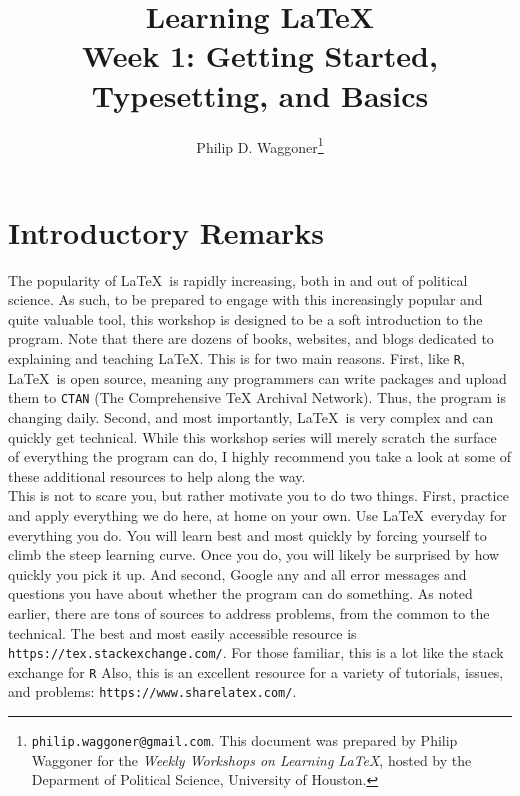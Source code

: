 \documentclass[11pt]{article}
\newcommand{\forceindent}{\leavevmode{\parindent=1.5em\indent}} %
\begin{document}
	
	\title{Learning \LaTeX \\
		\vspace{1cm}
	\large Week 1: Getting Started, Typesetting, and Basics \\
		\vspace{1cm}}
	\author{Philip D. Waggoner\footnote{{\texttt{philip.waggoner@gmail.com}}. This document was prepared by Philip Waggoner for the \textit{Weekly Workshops on Learning \LaTeX}, hosted by the Deparment of Political Science, University of Houston.}}
	\date{ } %
	\maketitle

\newpage

\tableofcontents

\newpage

\section{Introductory Remarks}
	
	\forceindent The popularity of \LaTeX\ is rapidly increasing, both in and out of political science. As such, to be prepared to engage with this increasingly popular and quite valuable tool, this workshop is designed to be a soft introduction to the program. Note that there are dozens of books, websites, and blogs dedicated to explaining and teaching \LaTeX. This is for two main reasons. First, like \texttt{R}, \LaTeX\ is open source, meaning any programmers can write packages and upload them to \texttt{CTAN} (The Comprehensive TeX Archival Network). Thus, the program is changing daily. Second, and most importantly, \LaTeX\ is very complex and can quickly get technical. While this workshop series will merely scratch the surface of everything the program can do, I highly recommend you take a look at some of these additional resources to help along the way. \\

	This is not to scare you, but rather motivate you to do two things. First, practice and apply everything we do here, at home on your own. Use \LaTeX\ everyday for everything you do. You will learn best and most quickly by forcing yourself to climb the steep learning curve. Once you do, you will likely be surprised by how quickly you pick it up. And second, Google any and all error messages and questions you have about whether the program can do something. As noted earlier, there are tons of sources to address problems, from the common to the technical. The best and most easily accessible resource is \texttt{https://tex.stackexchange.com/}. For those familiar, this is a lot like the stack exchange for \texttt{R} Also, this is an excellent resource for a variety of tutorials, issues, and problems: \texttt{https://www.sharelatex.com/}. \\
\end{document}
